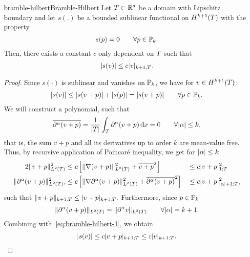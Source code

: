 \begin{Lemma*}{bramble-hilbert}{Bramble-Hilbert}
  Let $\cell\subset \R^d$ be a domain with Lipschitz boundary and let
  $s(.)$ be a bounded sublinear functional on $H^{k+1}(\cell)$ with
  the property
  \begin{gather}
    s(p) = 0 \qquad\forall p\in \P_k.
  \end{gather}
  Then, there exists a constant $c$ only dependent on $\cell$ such that
  \begin{gather}
    \abs{s(v)} \le c \snorm{v}_{k+1,\cell}.
  \end{gather}
\end{Lemma*}

\begin{proof}
  Since $s(\cdot)$ is sublinear and vanishes on $\P_k$, we have for
  $v\in H^{k+1}(\cell)$:
  \begin{gather}
    \label{eq:bramble-hilbert-1}
    \abs{s(v)} \le \abs{s(v+p)} + \abs{s(p)} = \abs{s(v+p)}
    \qquad\forall p\in\P_k.
  \end{gather}
  We will construct a polynomial, such that
  \begin{gather}
    \label{eq:bramble-hilbert-2}
    \overline{\d^\alpha(v+p)}
    = \frac1{\abs{\cell}}\int_\cell \d^\alpha (v+p) \dx = 0
    \qquad\forall \abs{\alpha} \le k,
  \end{gather}
  that is, the sum $v+p$ and all its derivatives up to order $k$ are
  mean-value free. Thus, by recursive application of Poincaré
  inequality, we get for $\abs{\alpha}\le k$
  \begin{alignat*}2
    \norm{v+p}_{L^2(\cell)}^2
    &\le c \left[ \norm{\nabla(v+p)}_{L^2(\cell)}^2 + \overline{v+p}^2\right]
      && \le c \snorm{v+p}_{1;\cell}^2\\
    \norm{\d^\alpha(v+p)}_{L^2(\cell)}^2,
    &\le c \left[ \norm{\nabla\d^\alpha(v+p)}_{L^2(\cell)}^2
      + \overline{\d^\alpha(v+p)}^2\right]
      && \le c \snorm{v+p}_{\abs{\alpha}+1;\cell}^2,
  \end{alignat*}
  such that $\norm{v+p}_{k+1;\cell} \le \snorm{v+p}_{k+1;\cell}$.
  Furthermore, since $p\in\P_k$
  \begin{gather*}
    \norm{\d^\alpha(v+p)}_{L^2(\cell)} = \norm{\d^\alpha v}_{L^2(\cell)}
    \qquad\forall \abs{\alpha} = k+1.
  \end{gather*}
  Combining with~\eqref{eq:bramble-hilbert-1}, we obtain
  \begin{gather*}
    \abs{s(v)} \le c \snorm{v+p}_{k+1;\cell} \le c \snorm{v}_{k+1;\cell}.

\end{gather*}
\end{proof}

